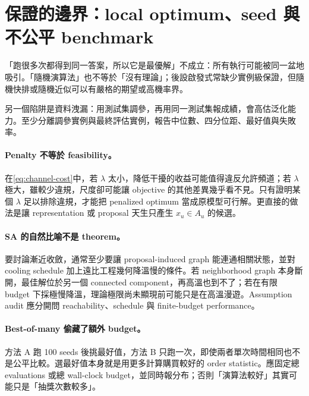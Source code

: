 \documentclass[11pt,a4paper,oneside,openany]{book}
\begin{document}
\section{保證的邊界：local optimum、seed 與不公平 benchmark}
\begin{misconception}
「跑很多次都得到同一答案，所以它是最優解」不成立：所有執行可能被同一盆地吸引。「隨機演算法」也不等於「沒有理論」；後設啟發式常缺少實例級保證，但隨機快排或隨機近似可以有嚴格的期望或高機率界。
\end{misconception}
另一個陷阱是資料洩漏：用測試集調參，再用同一測試集報成績，會高估泛化能力。至少分離調參實例與最終評估實例，報告中位數、四分位距、最好值與失敗率。

\paragraph{Penalty 不等於 feasibility。}
在\cref{eq:channel-cost}中，若 $\lambda$ 太小，降低干擾的收益可能值得違反允許頻道；若 $\lambda$ 極大，雖較少違規，尺度卻可能讓 objective 的其他差異幾乎看不見。只有證明某個 $\lambda$ 足以排除違規，才能把 penalized optimum 當成原模型可行解。更直接的做法是讓 representation 或 proposal 天生只產生 $x_u\in A_u$ 的候選。

\paragraph{SA 的自然比喻不是 theorem。}
要討論漸近收斂，通常至少要讓 proposal-induced graph 能連通相關狀態，並對 cooling schedule 加上遠比工程幾何降溫慢的條件。若 neighborhood graph 本身斷開，最佳解位於另一個 connected component，再高溫也到不了；若在有限 budget 下採極慢降溫，理論極限尚未顯現前可能只是在高溫漫遊。Assumption audit 應分開問 reachability、schedule 與 finite-budget performance。

\paragraph{Best-of-many 偷藏了額外 budget。}
方法 A 跑 100 seeds 後挑最好值，方法 B 只跑一次，即使兩者單次時間相同也不是公平比較。選最好值本身就是用更多計算購買較好的 order statistic。應固定總 evaluations 或總 wall-clock budget，並同時報分布；否則「演算法較好」其實可能只是「抽獎次數較多」。
\end{document}
